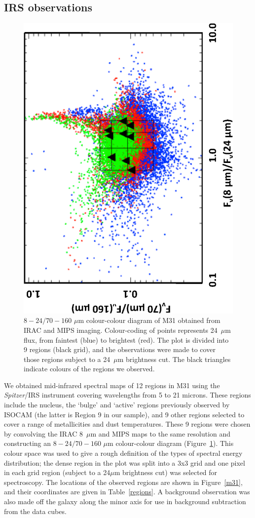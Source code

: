 \subsection{IRS observations}
\label{sect:irs_obs}

\begin{figure}
\centering
\includegraphics[width = 6.5 cm,angle=270]{fig1.eps}
\caption{$8 - 24/70 - 160$ $\mu$m colour-colour diagram of M31 obtained from IRAC and MIPS imaging. Colour-coding of points represents
24~$\mu$m flux, from faintest (blue) to brightest (red). The plot is divided into 9 regions (black grid), and the observations were made to 
cover those regions subject to a 24~$\mu$m brightness cut. The black triangles indicate colours of the regions we observed.}
\label{colourmaps}
\end{figure}

We obtained mid-infrared spectral maps of 12 regions in M31 using the {\em Spitzer}/IRS instrument \citep{IRS2004} covering wavelengths from 5 to 21 microns. 
These regions include the nucleus, the `bulge' and `active' regions previously observed by ISOCAM (the latter is Region 9 in our sample), 
and 9 other regions selected to cover a range of metallicities and dust temperatures. These 9 regions were chosen by convolving the IRAC 8~$\mu$m \citep{Barmby2006lr}
and MIPS \citep{gordon06a} maps to the same resolution and constructing an $8 - 24/70 - 160$ $\mu$m colour-colour diagram (Figure~\ref{colourmaps}).
This colour space was used to give a rough definition of the types of spectral energy distribution; the 
dense region in the plot was split into a 3x3 grid and one pixel in each grid region (subject to a 24$\mu$m brightness cut)
was selected for spectroscopy. The locations of the observed regions are shown in Figure~\ref{m31}, and 
their coordinates are given in Table~\ref{regions}. A background observation was also made off the galaxy 
along the minor axis for use in background subtraction from the data cubes.


